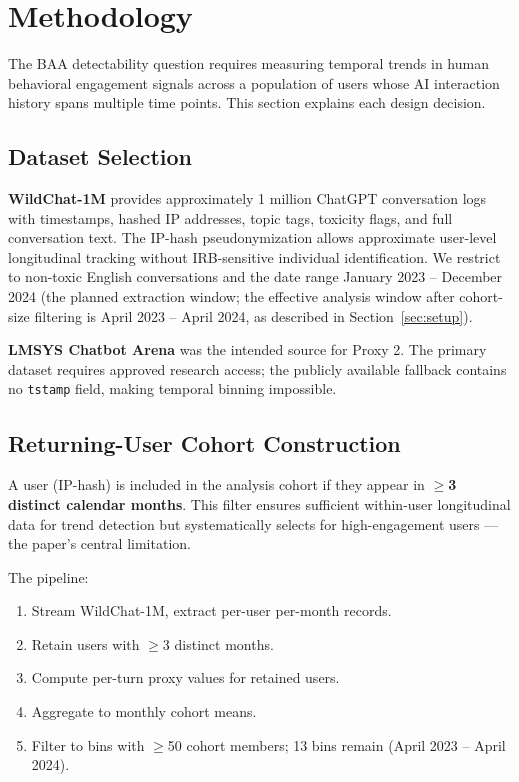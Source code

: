 \section{Methodology}
\label{sec:methodology}

The BAA detectability question requires measuring temporal trends in human behavioral engagement signals across a population of users whose AI interaction history spans multiple time points. This section explains each design decision.

\subsection{Dataset Selection}

\textbf{WildChat-1M} \citep{Zhao2024WildChat} provides approximately 1 million ChatGPT conversation logs with timestamps, hashed IP addresses, topic tags, toxicity flags, and full conversation text. The IP-hash pseudonymization allows approximate user-level longitudinal tracking without IRB-sensitive individual identification. We restrict to non-toxic English conversations and the date range January 2023 -- December 2024 (the planned extraction window; the effective analysis window after cohort-size filtering is April 2023 -- April 2024, as described in Section~\ref{sec:setup}).

\textbf{LMSYS Chatbot Arena} \citep{Zheng2023Judging} was the intended source for Proxy 2. The primary dataset requires approved research access; the publicly available fallback contains no \texttt{tstamp} field, making temporal binning impossible.

\subsection{Returning-User Cohort Construction}

A user (IP-hash) is included in the analysis cohort if they appear in \textbf{$\geq$3 distinct calendar months}. This filter ensures sufficient within-user longitudinal data for trend detection but systematically selects for high-engagement users --- the paper's central limitation.

The pipeline:
\begin{enumerate}
  \item Stream WildChat-1M, extract per-user per-month records.
  \item Retain users with $\geq$3 distinct months.
  \item Compute per-turn proxy values for retained users.
  \item Aggregate to monthly cohort means.
  \item Filter to bins with $\geq$50 cohort members; 13 bins remain (April 2023 -- April 2024).
\end{enumerate}

